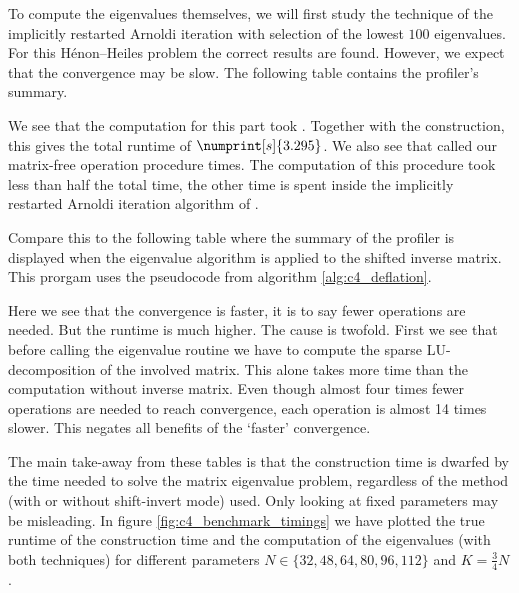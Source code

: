 To compute the eigenvalues themselves, we will first study the technique of the implicitly restarted Arnoldi iteration with selection of the lowest $100$ eigenvalues. For this Hénon--Heiles problem the correct results are found. However, we expect that the convergence may be slow. The following table contains the profiler's summary.
\begin{center}
    
\end{center}
We see that the computation for this part took . Together with the construction, this gives the total runtime of $\numprint[s]{3.295}$. We also see that \spectra{} called our matrix-free operation procedure  times. The computation of this procedure took less than half the total time, the other time is spent inside the implicitly restarted Arnoldi iteration algorithm of \spectra{}.

Compare this to the following table where the summary of the profiler is displayed when the eigenvalue algorithm is applied to the shifted inverse matrix. This prorgam uses the pseudocode from algorithm \ref{alg:c4_deflation}.
\begin{center}
    
\end{center}
Here we see that the convergence is faster, it is to say fewer operations are needed. But the runtime  is much higher. The cause is twofold. First we see that before calling the eigenvalue routine we have to compute the sparse LU-decomposition of the involved matrix. This alone takes more time than the computation without inverse matrix. Even though almost four times fewer operations are needed to reach convergence, each operation is almost 14 times slower. This negates all benefits of the `faster' convergence.

The main take-away from these tables is that the construction time is dwarfed by the time needed to solve the matrix eigenvalue problem, regardless of the method (with or without shift-invert mode) used. Only looking at fixed parameters may be misleading. In figure \ref{fig:c4_benchmark_timings} we have plotted the true runtime of the construction time and the computation of the eigenvalues (with both techniques) for different parameters $N \in \{32,48,64,80,96,112\}$ and $K = \frac{3}{4}N$.

